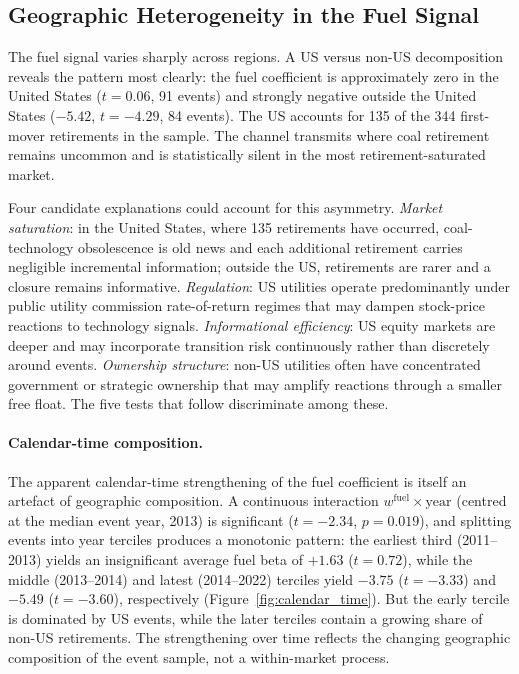 \documentclass[12pt,a4paper]{article}
\begin{document}
\subsection{Geographic Heterogeneity in the Fuel Signal}\label{sec:learning}

The fuel signal varies sharply across regions. A US versus non-US decomposition reveals the pattern most clearly: the fuel coefficient is approximately zero in the United States ($t = 0.06$, 91 events) and strongly negative outside the United States ($-5.42$, $t = -4.29$, 84 events). The US accounts for 135 of the 344 first-mover retirements in the sample. The channel transmits where coal retirement remains uncommon and is statistically silent in the most retirement-saturated market.

Four candidate explanations could account for this asymmetry. \emph{Market saturation}: in the United States, where 135 retirements have occurred, coal-technology obsolescence is old news and each additional retirement carries negligible incremental information; outside the US, retirements are rarer and a closure remains informative. \emph{Regulation}: US utilities operate predominantly under public utility commission rate-of-return regimes that may dampen stock-price reactions to technology signals. \emph{Informational efficiency}: US equity markets are deeper and may incorporate transition risk continuously rather than discretely around events. \emph{Ownership structure}: non-US utilities often have concentrated government or strategic ownership that may amplify reactions through a smaller free float. The five tests that follow discriminate among these.

\paragraph{Calendar-time composition.}
The apparent calendar-time strengthening of the fuel coefficient is itself an artefact of geographic composition. A continuous interaction $w^{\text{fuel}} \times \text{year}$ (centred at the median event year, 2013) is significant ($t = -2.34$, $p = 0.019$), and splitting events into year terciles produces a monotonic pattern: the earliest third (2011--2013) yields an insignificant average fuel beta of $+1.63$ ($t = 0.72$), while the middle (2013--2014) and latest (2014--2022) terciles yield $-3.75$ ($t = -3.33$) and $-5.49$ ($t = -3.60$), respectively (Figure~\ref{fig:calendar_time}). But the early tercile is dominated by US events, while the later terciles contain a growing share of non-US retirements. The strengthening over time reflects the changing geographic composition of the event sample, not a within-market process.
\end{document}
